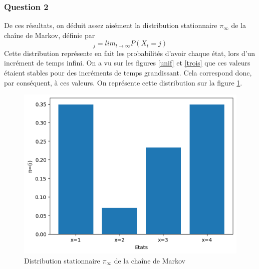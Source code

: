 \documentclass[a4paper, 11pt]{article}
\begin{document}
 \subsubsection{Question 2}
 De ces résultats, on déduit assez aisément la distribution stationnaire $\pi_\infty$ de la chaîne de Markov, définie par 
 \begin{equation}
     [\pi_\infty]_j=lim_{t\rightarrow \infty} P(X_t=j)
 \end{equation}
Cette distribution représente en fait les probabilités d'avoir chaque état, lors d'un incrément de temps infini. On a vu sur les figures \ref{unif} et \ref{trois} que ces valeurs étaient stables pour des incréments de temps grandissant. Cela correspond donc, par conséquent, à ces valeurs. On représente cette distribution sur la figure \ref{fig:dist_inf}.
\begin{figure}[h!]
    \centering
    \includegraphics[scale=0.6]{pi_inf.png}
    \caption{Distribution stationnaire $\pi_\infty$ de la chaîne de Markov}
    \label{fig:dist_inf}
\end{figure}
\newpage
\end{document}
